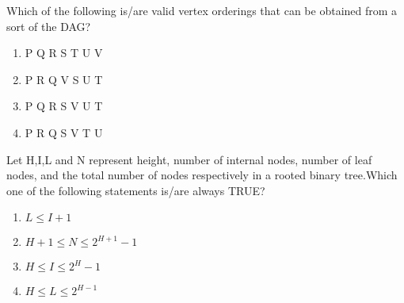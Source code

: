   Which of the following is/are valid vertex orderings that can be obtained from a sort of the DAG?
  \begin{enumerate}
      \item P Q R S T U V
      \item P R Q V S U T
      \item P Q R S V U T
      \item P R Q S V T U
  \end{enumerate}
  \item Let H,I,L and N represent height, number of internal nodes, number of leaf nodes, and the total number of nodes respectively in a rooted binary tree.Which one of the following statements is/are always TRUE?
  \begin{enumerate}
      \item $L\leq I+1$
      \item $H+1 \leq N \leq 2^{H+1}-1$
      \item $H \leq I \leq 2^H-1$
      \item $H \leq L \leq 2^{H-1}$
  \end{enumerate}
